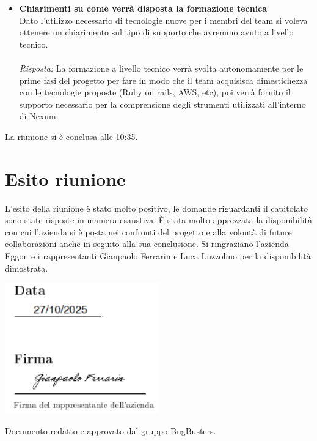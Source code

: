 \documentclass[a4paper,12pt]{article}
\begin{document}
\begin{itemize}
    \item \textbf{Chiarimenti su come verrà disposta la formazione tecnica}\\
    \noindent
    Dato l'utilizzo necessario di tecnologie nuove per i membri del team si voleva ottenere un chiarimento sul tipo di supporto che avremmo avuto a livello tecnico. \\ \\
    \textit{Risposta:} 
    La formazione a livello tecnico verrà svolta autonomamente per le prime fasi del progetto per fare in modo che il team acquisisca dimestichezza con le tecnologie proposte (Ruby on rails, AWS, etc), poi verrà fornito il supporto necessario per la comprensione degli strumenti utilizzati all'interno di Nexum. 
    \vspace{1em}

\end{itemize}

La riunione si è conclusa alle 10:35.


\section{Esito riunione}
    L'esito della riunione è stato molto positivo, le domande riguardanti il capitolato sono state risposte in maniera esaustiva. È stata molto apprezzata la disponibilità con cui l'azienda si è posta nei confronti del progetto e alla volontà di future collaborazioni anche in seguito alla sua conclusione. Si ringraziano l'azienda Eggon e i rappresentanti Gianpaolo Ferrarin e Luca Luzzolino per la disponibilità dimostrata.
    
\vspace{1.0cm}
\noindent
\includegraphics[width=0.5\textwidth]{Data e firma.png}

\vfill
\begin{center}
    {\small\color{darkgray} Documento redatto e approvato dal gruppo BugBusters.}
\end{center}
\end{document}
